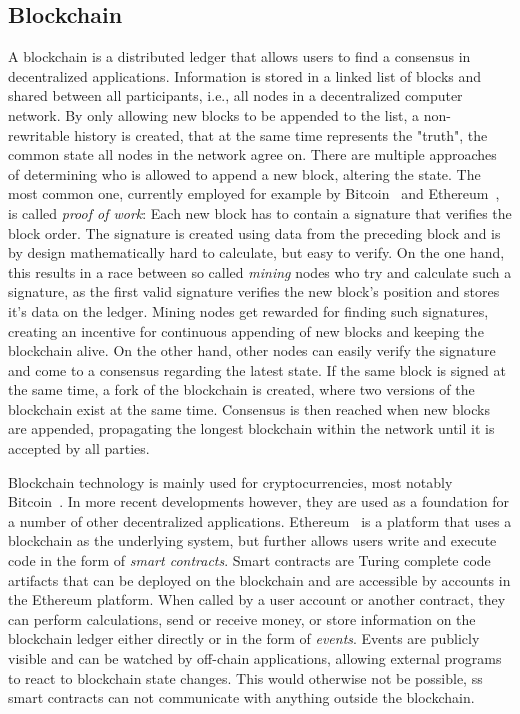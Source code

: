 \documentclass[runningheads]{llncs}
\begin{document}
\subsection{Blockchain}

A blockchain is a distributed ledger that allows users to find a consensus in decentralized applications.
Information is stored in a linked list of blocks and shared between all participants, i.e., all nodes in a decentralized computer network.
By only allowing new blocks to be appended to the list, a non-rewritable history is created, that at the same time represents the "truth", the common state all nodes in the network agree on.
There are multiple approaches of determining who is allowed to append a new block, altering the state.
The most common one, currently employed for example by Bitcoin~\cite{nakamoto2008bitcoin} and Ethereum~\cite{wood2014ethereum}, is called \emph{proof of work}:
Each new block has to contain a signature that verifies the block order.
The signature is created using data from the preceding block and is by design mathematically hard to calculate, but easy to verify.
On the one hand, this results in a race between so called \emph{mining} nodes who try and calculate such a signature, as the first valid signature verifies the new block's position and stores it's data on the ledger.
Mining nodes get rewarded for finding such signatures, creating an incentive for continuous appending of new blocks and keeping the blockchain alive.
On the other hand, other nodes can easily verify the signature and come to a consensus regarding the latest state.
If the same block is signed at the same time, a fork of the blockchain is created, where two versions of the blockchain exist at the same time.
Consensus is then reached when new blocks are appended, propagating the longest blockchain within the network until it is accepted by all parties.

Blockchain technology is mainly used for cryptocurrencies, most notably Bitcoin~\cite{nakamoto2008bitcoin}.
In more recent developments however, they are used as a foundation for a number of other decentralized applications.
Ethereum~\cite{wood2014ethereum} is a platform that uses a blockchain as the underlying system, but further allows users write and execute code in the form of \emph{smart contracts}.
Smart contracts are Turing complete code artifacts that can be deployed on the blockchain and are accessible by accounts in the Ethereum platform.
When called by a user account or another contract, they can perform calculations, send or receive money, or store information on the blockchain ledger either directly or in the form of \emph{events}.
Events are publicly visible and can be watched by off-chain applications, allowing external programs to react to blockchain state changes.
This would otherwise not be possible, ss smart contracts can not communicate with anything outside the blockchain.
\end{document}
